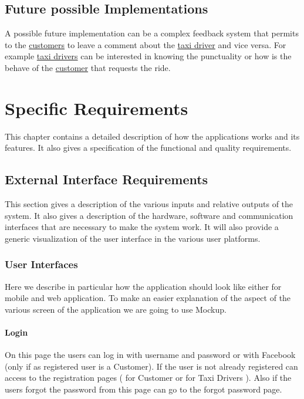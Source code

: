 \documentclass{report}
\begin{document}
	\section{Future possible Implementations}
	A possible future implementation can be a complex feedback system that permits to the \hyperref[sec:customer]{customers} to leave a comment about the \hyperref[sec:tdriver]{taxi driver} and vice versa.
	For example \hyperref[sec:tdriver]{taxi drivers} can be interested in knowing the punctuality or how is the behave of the \hyperref[sec:customer]{customer} that requests the ride.

\chapter{Specific Requirements}
This chapter contains a detailed description of how the applications works and its features. It also gives a specification of the functional and quality requirements.

	\section{External Interface Requirements}
	This section gives a description of the various inputs and relative outputs of the system. It also gives a description of the hardware, software and communication interfaces that are necessary to make the system work. It will also provide a generic visualization of the user interface in the various user platforms.

		\subsection{User Interfaces}
		Here we describe in particular how the application should look like either for mobile and web application. To make an easier explanation of the aspect of the various screen of 			the application we are going to use Mockup.
			\subsubsection{Login}
			On this page the users can log in with username and password or with Facebook (only if as registered user is a Customer). If the user is not already registered can access to the 					registration pages ( for Customer or for Taxi Drivers ). Also if the users forgot the password from this page can go to the forgot password page.
				
\end{document}
